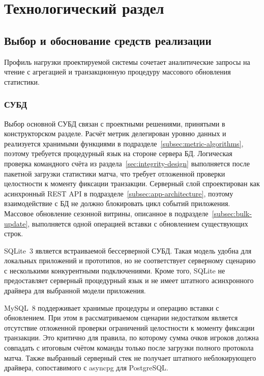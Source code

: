 ﻿\chapter{Технологический раздел}

\section{Выбор и обоснование средств реализации}

Профиль нагрузки проектируемой системы сочетает аналитические запросы
на чтение с агрегацией и транзакционную процедуру массового обновления
статистики.

\subsection{СУБД}

Выбор основной СУБД связан с проектными решениями, принятыми в
конструкторском разделе. Расчёт метрик делегирован уровню данных
и реализуется хранимыми функциями в подразделе~\ref{subsec:metric-algorithms},
поэтому требуется процедурный язык на стороне сервера БД. Логическая
проверка командного счёта из раздела~\ref{sec:integrity-design} выполняется
после пакетной загрузки статистики матча, что требует отложенной проверки
целостности к моменту фиксации транзакции. Серверный слой спроектирован
как асинхронный REST API в подразделе~\ref{subsec:app-architecture}, поэтому
взаимодействие с БД не должно блокировать цикл событий приложения. Массовое
обновление сезонной витрины, описанное в подразделе~\ref{subsec:bulk-update},
выполняется одной операцией вставки с обновлением существующих строк.

SQLite~3 является встраиваемой бессерверной СУБД. Такая модель удобна для
локальных приложений и прототипов, но не соответствует серверному сценарию
с несколькими конкурентными подключениями. Кроме того, SQLite не предоставляет
серверный процедурный язык и не имеет штатного асинхронного драйвера для
выбранной модели приложения.

MySQL~8 поддерживает хранимые процедуры и операцию вставки с обновлением.
При этом в рассматриваемом сценарии недостатком является отсутствие
отложенной проверки ограничений целостности к моменту фиксации транзакции.
Это критично для правила, по которому сумма очков игроков должна совпадать
с итоговым счётом команды только после загрузки полного протокола матча.
Также выбранный серверный стек не получает штатного неблокирующего драйвера,
сопоставимого с asyncpg для PostgreSQL.

